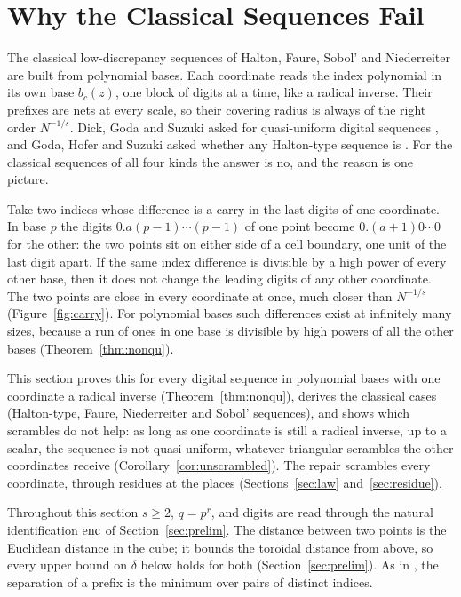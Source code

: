 %
%
%
%
%
%
\section{Why the Classical Sequences Fail}\label{sec:fail}
The classical low-discrepancy sequences of Halton, Faure, Sobol' and Niederreiter are built from polynomial bases. Each coordinate reads the index polynomial in its own base $b_c(z)$, one block of digits at a time, like a radical inverse. Their prefixes are nets at every scale, so their covering radius is always of the right order $N^{-1/s}$. Dick, Goda and Suzuki asked for quasi-uniform digital sequences \cite{DGS2}, and Goda, Hofer and Suzuki asked whether any Halton-type sequence is \cite{GHS26}. For the classical sequences of all four kinds the answer is no, and the reason is one picture.

Take two indices whose difference is a carry in the last digits of one coordinate. In base $p$ the digits $0.a(p-1)\cdots(p-1)$ of one point become $0.(a+1)0\cdots0$ for the other: the two points sit on either side of a cell boundary, one unit of the last digit apart. If the same index difference is divisible by a high power of every other base, then it does not change the leading digits of any other coordinate. The two points are close in every coordinate at once, much closer than $N^{-1/s}$ (Figure~\ref{fig:carry}). For polynomial bases such differences exist at infinitely many sizes, because a run of ones in one base is divisible by high powers of all the other bases (Theorem~\ref{thm:nonqu}).

This section proves this for every digital sequence in polynomial bases with one coordinate a radical inverse (Theorem~\ref{thm:nonqu}), derives the classical cases (Halton-type, Faure, Niederreiter and Sobol' sequences), and shows which scrambles do not help: as long as one coordinate is still a radical inverse, up to a scalar, the sequence is not quasi-uniform, whatever triangular scrambles the other coordinates receive (Corollary~\ref{cor:unscrambled}). The repair scrambles every coordinate, through residues at the places (Sections~\ref{sec:law} and~\ref{sec:residue}).


Throughout this section $s\ge2$, $q=p^r$, and digits are read through the natural identification $\operatorname{enc}$ of Section~\ref{sec:prelim}. The distance between two points is the Euclidean distance in the cube; it bounds the toroidal distance from above, so every upper bound on $\delta$ below holds for both (Section~\ref{sec:prelim}). As in \cite{GHS26}, the separation of a prefix is the minimum over pairs of distinct indices.

